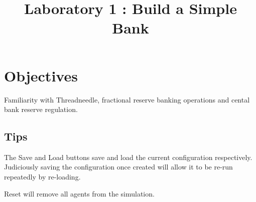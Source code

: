 \documentclass{article}
\title{Laboratory 1 : Build a Simple Bank}
\begin{document}
\date{}
\maketitle %



\section*{\centering Objectives}
Familiarity with Threadneedle, fractional reserve banking operations and
cental bank reserve regulation.

\subsection*{Tips}
The Save and Load buttons save and load the current configuration respectively. Judiciously
saving the configuration once created will allow it to be re-run repeatedly by re-loading.
\par
Reset will remove all agents from the simulation.


 
\end{document}
